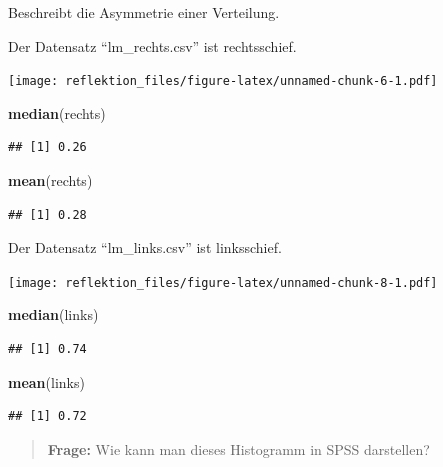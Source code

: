 \documentclass[
]{book}
\newenvironment{Shaded}{\begin{snugshade}}{\end{snugshade}}
\newcommand{\KeywordTok}[1]{\textcolor[rgb]{0.13,0.29,0.53}{\textbf{#1}}}
\newcommand{\NormalTok}[1]{#1}
\begin{document}
Beschreibt die Asymmetrie einer Verteilung.

Der Datensatz ``lm\_rechts.csv'' ist rechtsschief.

\texttt{[image: reflektion\_files/figure-latex/unnamed-chunk-6-1.pdf]}

\begin{Shaded}
\begin{Highlighting}[]
\KeywordTok{median}\NormalTok{(rechts)}
\end{Highlighting}
\end{Shaded}

\begin{verbatim}
## [1] 0.26
\end{verbatim}

\begin{Shaded}
\begin{Highlighting}[]
\KeywordTok{mean}\NormalTok{(rechts)}
\end{Highlighting}
\end{Shaded}

\begin{verbatim}
## [1] 0.28
\end{verbatim}

Der Datensatz ``lm\_links.csv'' ist linksschief.

\texttt{[image: reflektion\_files/figure-latex/unnamed-chunk-8-1.pdf]}

\begin{Shaded}
\begin{Highlighting}[]
\KeywordTok{median}\NormalTok{(links)}
\end{Highlighting}
\end{Shaded}

\begin{verbatim}
## [1] 0.74
\end{verbatim}

\begin{Shaded}
\begin{Highlighting}[]
\KeywordTok{mean}\NormalTok{(links)}
\end{Highlighting}
\end{Shaded}

\begin{verbatim}
## [1] 0.72
\end{verbatim}

\begin{quote}
\textbf{Frage:} Wie kann man dieses Histogramm in SPSS darstellen?
\end{quote}
\end{document}
